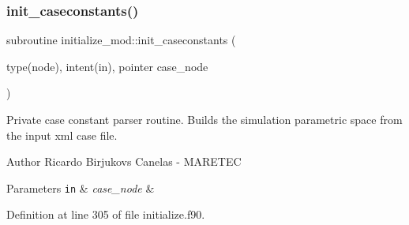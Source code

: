 \subsubsection{\texorpdfstring{init\+\_\+caseconstants()}{init\_caseconstants()}}
{\footnotesize\ttfamily subroutine initialize\+\_\+mod\+::init\+\_\+caseconstants (\begin{DoxyParamCaption}\item[{type(node), intent(in), pointer}]{case\+\_\+node }\end{DoxyParamCaption})\hspace{0.3cm}{\ttfamily [private]}}



Private case constant parser routine. Builds the simulation parametric space from the input xml case file. 

\begin{DoxyAuthor}{Author}
Ricardo Birjukovs Canelas -\/ M\+A\+R\+E\+T\+EC
\end{DoxyAuthor}

\begin{DoxyParams}[1]{Parameters}
\mbox{\tt in}  & {\em case\+\_\+node} & \\
\hline
\end{DoxyParams}


Definition at line 305 of file initialize.\+f90.


